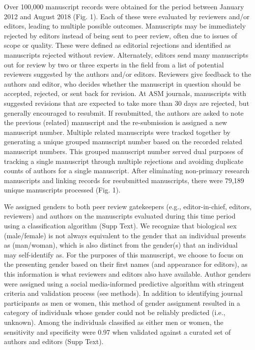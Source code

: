 \documentclass[11pt,]{article}
\begin{document}
Over 100,000 manuscript records were obtained for the period between
January 2012 and August 2018 (Fig. 1). Each of these were evaluated by
reviewers and/or editors, leading to multiple possible outcomes.
Manuscripts may be immediately rejected by editors instead of being sent
to peer review, often due to issues of scope or quality. These were
defined as editorial rejections and identified as manuscripts rejected
without review. Alternately, editors send many manuscripts out for
review by two or three experts in the field from a list of potential
reviewers suggested by the authors and/or editors. Reviewers give
feedback to the authors and editor, who decides whether the manuscript
in question should be accepted, rejected, or sent back for revision. At
ASM journals, manuscripts with suggested revisions that are expected to
take more than 30 days are rejected, but generally encouraged to
resubmit. If resubmitted, the authors are asked to note the previous
(related) manuscript and the re-submission is assigned a new manuscript
number. Multiple related manuscripts were tracked together by generating
a unique grouped manuscript number based on the recorded related
manuscript numbers. This grouped manuscript number served dual purposes
of tracking a single manuscript through multiple rejections and avoiding
duplicate counts of authors for a single manuscript. After eliminating
non-primary research manuscripts and linking records for resubmitted
manuscripts, there were 79,189 unique manuscripts processed (Fig. 1).

We assigned genders to both peer review gatekeepers (e.g.,
editor-in-chief, editors, reviewers) and authors on the manuscripts
evaluated during this time period using a classification algorithm (Supp
Text). We recognize that biological sex (male/female) is not always
equivalent to the gender that an individual presents as (man/woman),
which is also distinct from the gender(s) that an individual may
self-identify as. For the purposes of this manuscript, we choose to
focus on the presenting gender based on their first names (and
appearance for editors), as this information is what reviewers and
editors also have available. Author genders were assigned using a social
media-informed predictive algorithm with stringent criteria and
validation process (see methods). In addition to identifying journal
participants as men or women, this method of gender assignment resulted
in a category of individuals whose gender could not be reliably
predicted (i.e., unknown). Among the individuals classified as either
men or women, the sensitivity and specificity were 0.97 when validated
against a curated set of authors and editors (Supp Text).
\end{document}
